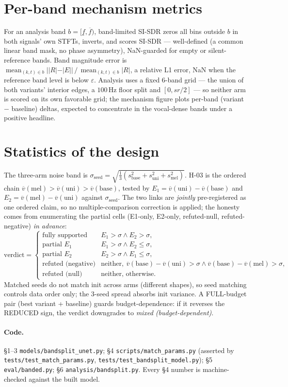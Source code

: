 \documentclass[11pt]{article}
\newcommand{\code}[1]{\texttt{#1}}
\newcommand{\mean}{\operatorname{mean}}
\newcommand{\val}{\overline{v}}
\begin{document}
\section{Per-band mechanism metrics}

For an analysis band $b=[\underline f,\overline f)$, band-limited SI-SDR zeros all
bins outside $b$ in both signals' own STFTs, inverts, and scores SI-SDR ---
well-defined (a common linear band mask, no phase asymmetry), NaN-guarded for empty
or silent-reference bands. Band magnitude error is
$\mean_{(k,t)\in b}||R|-|E||\,/\,\mean_{(k,t)\in b}|R|$, a relative L1 error,
NaN when the reference band level is below $\varepsilon$. Analysis uses a fixed
6-band grid --- the union of both variants' interior edges, a $100$\,Hz floor
split and $[0,sr/2]$ --- so neither arm is scored on its own favorable grid; the
mechanism figure plots per-band (variant $-$ baseline) deltas, expected to
concentrate in the vocal-dense bands under a positive headline.

\section{Statistics of the design}

The three-arm noise band is
$\sigma_{\text{seed}}=\sqrt{\tfrac13(s^2_{\text{base}}+s^2_{\text{uni}}
+s^2_{\text{mel}})}$. H-03 is the ordered chain $\val(\text{mel})>\val(\text{uni})
>\val(\text{base})$, tested by $E_1=\val(\text{uni})-\val(\text{base})$ and
$E_2=\val(\text{mel})-\val(\text{uni})$ against $\sigma_{\text{seed}}$. The two
links are \emph{jointly} pre-registered as one ordered claim, so no
multiple-comparison correction is applied; the honesty comes from enumerating the
partial cells (E1-only, E2-only, refuted-null, refuted-negative) \emph{in
advance}:
\[
\text{verdict}=\begin{cases}
\text{fully supported}& E_1>\sigma\wedge E_2>\sigma,\\
\text{partial }E_1& E_1>\sigma\wedge E_2\le\sigma,\\
\text{partial }E_2& E_2>\sigma\wedge E_1\le\sigma,\\
\text{refuted (negative)}& \text{neither},\ \val(\text{base})-\val(\text{uni})>\sigma\wedge\val(\text{base})-\val(\text{mel})>\sigma,\\
\text{refuted (null)}& \text{neither, otherwise.}
\end{cases}
\]
Matched seeds do not match init across arms (different shapes), so seed matching
controls data order only; the 3-seed spread absorbs init variance. A FULL-budget
pair (best variant + baseline) guards budget-dependence: if it reverses the
REDUCED sign, the verdict downgrades to \emph{mixed (budget-dependent)}.

\paragraph{Code.} \S1--3 \code{models/bandsplit\_unet.py}; \S4
\code{scripts/match\_params.py} (asserted by \code{tests/test\_match\_params.py},
\code{tests/test\_bandsplit\_model.py}); \S5 \code{eval/banded.py}; \S6
\code{analysis/bandsplit.py}. Every \S4 number is machine-checked against the built
model.
\end{document}
